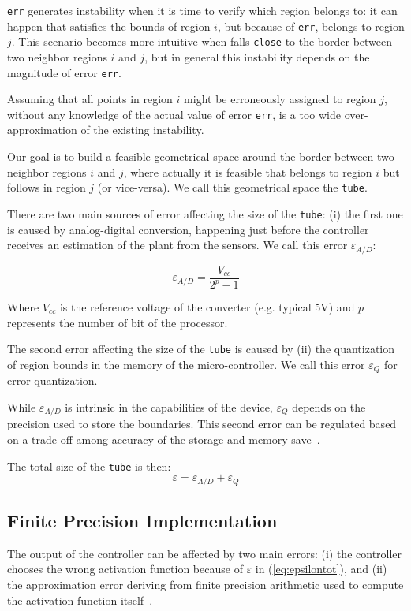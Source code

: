 \texttt{err} generates instability when it is time to verify which region \qstatevarmath belongs to: it can happen that \statevarmath satisfies the bounds of region $i$, but because of \texttt{err}, \qstatevarmath belongs to region $j$. This scenario becomes more intuitive when \qstatevarmath falls \texttt{close} to the border between two neighbor regions $i$ and $j$, but in general this instability depends on the magnitude of error \texttt{err}.

Assuming that all points in region $i$ might be erroneously assigned to region $j$, without any  knowledge of the actual value of error \texttt{err}, is a too wide over-approximation of the existing instability. 

Our goal is to build a feasible geometrical space around the border between two neighbor regions $i$ and $j$, where actually it is feasible that \statevarmath belongs to region $i$ but \qstatevarmath follows in region $j$ (or vice-versa).
We call this geometrical space the \texttt{tube}.

There are two main sources of error affecting the size of the \texttt{tube}: (i) the first one is caused by analog-digital conversion, happening just before the controller receives an estimation of the plant from the sensors. We call this error $\varepsilon_{A/D}$: 

\begin{equation}\nonumber
\varepsilon_{A/D}=\frac{V_{cc}}{2^{p}-1}
\end{equation}

Where $V_{cc}$ is the reference voltage of the converter (e.g. typical 5V) and $p$ represents the number of bit of the processor.

The second error affecting the size of the \texttt{tube} is caused by (ii) the quantization of region bounds in the memory of the micro-controller. We call this error $\varepsilon_{Q}$ for error quantization.

While $\varepsilon_{A/D}$ is intrinsic in the capabilities of the device, $\varepsilon_{Q}$ depends on the precision used to store the boundaries. This second error can be regulated based on a trade-off among accuracy of the storage and memory save~\cite{memoryMPC}.

The total size of the \texttt{tube} is then:
\begin{equation}\label{eq:epsilontot}
\varepsilon=\varepsilon_{A/D}+\varepsilon_{Q}
\end{equation}
\subsection{Finite Precision Implementation}
The output of the controller can be affected by two main errors: (i) the controller chooses the wrong activation function because of $\varepsilon$ in (\ref{eq:epsilontot}), and (ii) the approximation error deriving from finite precision arithmetic used to compute the activation function itself~\cite{imperialrmpc}.

